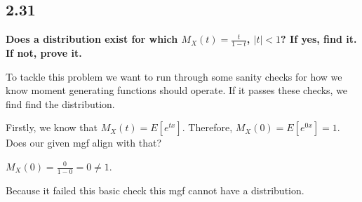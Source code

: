 \subsection*{2.31}

\textbf{Does a distribution exist for which $M_X(t) = \frac{t}{1-t}$, $|t| < 1$? If yes, find it. If not, prove it.}

To tackle this problem we want to run through some sanity checks for how we know moment generating functions should operate. If it passes these checks, we find find the distribution.

Firstly, we know that $M_X(t) = E[e^{tx}]$. Therefore, $M_X(0) = E[e^{0x}] = 1$. Does our given mgf align with that?

\noindent $M_X(0) = \frac{0}{1-0} = 0 \neq 1$.

Because it failed this basic check this mgf cannot have a distribution.


